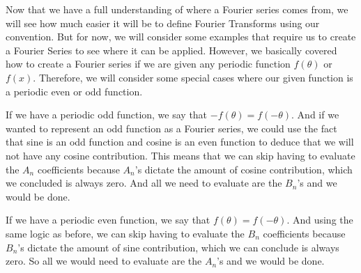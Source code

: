 \documentclass{article}
\begin{document}
Now that we have a full understanding of where a Fourier series comes from, we will see how much easier it will be to define Fourier Transforms using our convention.
But for now, we will consider some examples that require us to create a Fourier Series to see where it can be applied.
However, we basically covered how to create a Fourier series if we are given any periodic function $f(\theta)$ or $f(x)$.
Therefore, we will consider some special cases where our given function is a periodic even or odd function.

If we have a periodic odd function, we say that $-f(\theta) = f(-\theta)$.
And if we wanted to represent an odd function as a Fourier series, we could use the fact that sine is an odd function and cosine is an even function to deduce that we will not have any cosine contribution.
This means that we can skip having to evaluate the $A_n$ coefficients because $A_n$'s dictate the amount of cosine contribution, which we concluded is always zero.
And all we need to evaluate are the $B_n$'s and we would be done.

If we have a periodic even function, we say that $f(\theta) = f(- \theta)$.
And using the same logic as before, we can skip having to evaluate the $B_n$ coefficients because $B_n$'s dictate the amount of sine contribution, which we can conclude is always zero.
So all we would need to evaluate are the $A_n$'s and we would be done.
\end{document}
